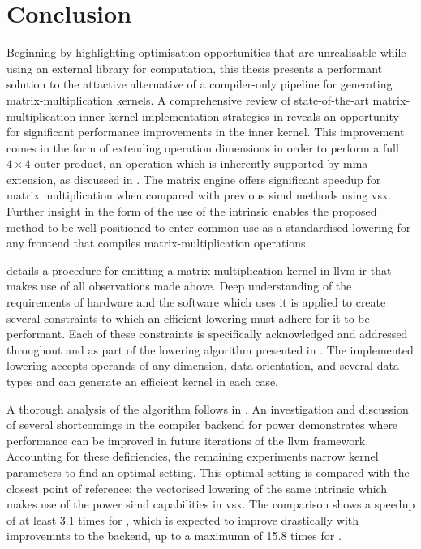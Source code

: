 \documentclass[\main/thesis.tex]{subfiles}
\begin{document}
\chapter{Conclusion}
\label{cha:conclusion}
Beginning by highlighting optimisation opportunities that are unrealisable while using an external library for computation, this thesis presents a performant solution to the attactive alternative of a compiler-only pipeline for generating matrix-multiplication kernels.
A comprehensive review of state-of-the-art matrix-multiplication inner-kernel implementation strategies in  reveals an opportunity for significant performance improvements in the inner kernel.
This improvement comes in the form of extending operation dimensions in order to perform a full $4 \times 4$ outer-product, an operation which is inherently supported by  \gls{mma} extension, as discussed in .
The \gls{matrix engine} offers significant speedup for matrix multiplication when compared with previous \gls{simd} methods using \gls{vsx}.
Further insight in the form of the use of the  intrinsic enables the proposed method to be well positioned to enter common use as a standardised \gls{lowering} for any frontend that compiles matrix-multiplication operations.

 details a procedure for emitting a matrix-multiplication kernel in \gls{llvm} \gls{ir} that makes use of all observations made above.
Deep understanding of the requirements of hardware and the software which uses it is applied to create several constraints to which an efficient \gls{lowering} must adhere for it to be performant.
Each of these constraints is specifically acknowledged and addressed throughout  and as part of the \gls{lowering} algorithm presented in .
The implemented lowering accepts operands of any dimension, data orientation, and several data types and can generate an efficient kernel in each case.

A thorough analysis of the algorithm follows in .
An investigation and discussion of several shortcomings in the compiler backend for \gls{power} demonstrates where performance can be improved in future iterations of the \gls{llvm} framework.
Accounting for these deficiencies, the remaining experiments narrow kernel parameters to find an optimal setting.
This optimal setting is compared with the closest point of reference: the vectorised lowering of the same intrinsic which makes use of the \gls{power}  \gls{simd} capabilities in \gls{vsx}.
The comparison shows a speedup of at least 3.1 times for , which is expected to improve drastically with improvemnts to the backend, up to a maximumn of 15.8 times for .

\end{document}
